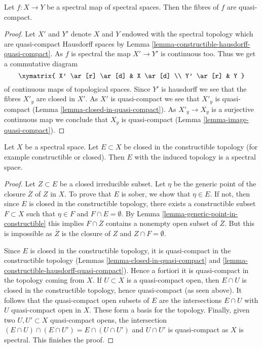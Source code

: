 \begin{lemma}
\label{lemma-fibres-spectral-map-quasi-compact}
Let $f : X \to Y$ be a spectral map of spectral spaces.
Then the fibres of $f$ are quasi-compact.
\end{lemma}

\begin{proof}
Let $X'$ and $Y'$ denote $X$ and $Y$ endowed with the spectral topology
which are quasi-compact Hausdorff spaces by
Lemma \ref{lemma-constructible-hausdorff-quasi-compact}.
As $f$ is spectral the map $X' \to Y'$ is continuous too.
Thus we get a commutative diagram
$$
\xymatrix{
X' \ar[r] \ar[d] & X \ar[d] \\
Y' \ar[r] & Y
}
$$
of continuous maps of topological spaces. Since $Y'$ is hausdorff
we see that the fibres $X'_y$ are closed in $X'$. As $X'$ is quasi-compact
we see that $X'_y$ is quasi-compact
(Lemma \ref{lemma-closed-in-quasi-compact}).
As $X'_y \to X_y$ is a surjective continuous map we conclude
that $X_y$ is quasi-compact (Lemma \ref{lemma-image-quasi-compact}).
\end{proof}

\begin{lemma}
\label{lemma-spectral-sub}
Let $X$ be a spectral space. Let $E \subset X$ be closed in the constructible
topology (for example constructible or closed). Then $E$ with the induced
topology is a spectral space.
\end{lemma}

\begin{proof}
Let $Z \subset E$ be a closed irreducible subset. Let $\eta$ be the generic
point of the closure $\overline{Z}$ of $Z$ in $X$. To prove that $E$
is sober, we show that $\eta \in E$. If not, then since $E$ is closed
in the constructible topology, there exists a constructible subset
$F \subset X$ such that $\eta \in F$ and $F \cap E = \emptyset$.
By Lemma \ref{lemma-generic-point-in-constructible} this implies
$F \cap \overline{Z}$ contains a nonempty open subset of $\overline{Z}$.
But this is impossible as $\overline{Z}$ is the closure of $Z$ and
$Z \cap F = \emptyset$.

\medskip\noindent
Since $E$ is closed in the constructible topology, it is quasi-compact
in the constructible topology
(Lemmas \ref{lemma-closed-in-quasi-compact} and
\ref{lemma-constructible-hausdorff-quasi-compact}). Hence a fortiori it is
quasi-compact in the topology coming from $X$. If $U \subset X$
is a quasi-compact open, then $E \cap U$ is closed in the constructible
topology, hence quasi-compact (as seen above). It follows that the
quasi-compact open subsets of $E$ are the intersections $E \cap U$
with $U$ quasi-compact open in $X$. These form a basis for the topology.
Finally, given two $U, U' \subset X$ quasi-compact opens, the intersection
$(E \cap U) \cap (E \cap U') = E \cap (U \cap U')$ and $U \cap U'$
is quasi-compact as $X$ is spectral. This finishes the proof.
\end{proof}

